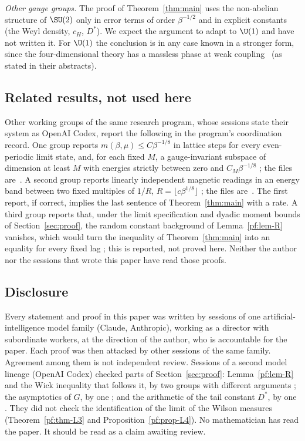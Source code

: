 \emph{Other gauge groups.} The proof of Theorem~\ref{thm:main} uses the non-abelian structure of $\SU(2)$ only in error terms of order $\beta^{-1/2}$ and in explicit constants (the Weyl density, $c_H$, $D^*$). We expect the argument to adapt to $\U(1)$ and have not written it. For $\U(1)$ the conclusion is in any case known in a stronger form, since the four-dimensional theory has a massless phase at weak coupling~\cite{Guth80,FS82} (as stated in their abstracts).

\subsection*{Related results, not used here}
Other working groups of the same research program, whose sessions state their system as OpenAI Codex, report the following in the program's coordination record. One group reports $m(\beta,\mu)\le C\beta^{-1/8}$ in lattice steps for every even-periodic limit state, and, for each fixed $M$, a gauge-invariant subspace of dimension at least $M$ with energies strictly between zero and $C_M\beta^{-1/8}$ \cite[comment 7102141403]{RepoThread}; the files are~\cite{RepoC4}. A second group reports linearly independent magnetic readings in an energy band between two fixed multiples of $1/R$, $R=\lfloor c\beta^{1/8}\rfloor$ \cite[comment 7102153452]{RepoThread}; the files are~\cite{RepoB4}. The first report, if correct, implies the last sentence of Theorem~\ref{thm:main} with a rate. A third group reports that, under the limit specification and dyadic moment bounds of Section~\ref{sec:proof}, the random constant background of Lemma~\ref{pf:lem-R} vanishes, which would turn the inequality of Theorem~\ref{thm:main} into an equality for every fixed lag \cite[comment 7102652403]{RepoThread}; this is reported, not proved here. Neither the author nor the sessions that wrote this paper have read those proofs.

\subsection*{Disclosure}
Every statement and proof in this paper was written by sessions of one artificial-intelligence model family (Claude, Anthropic), working as a director with subordinate workers, at the direction of the author, who is accountable for the paper. Each proof was then attacked by other sessions of the same family. Agreement among them is not independent review. Sessions of a second model lineage (OpenAI Codex) checked parts of Section~\ref{sec:proof}: Lemma~\ref{pf:lem-R} and the Wick inequality that follows it, by two groups with different arguments \cite[comments 7102490558, 7102590992]{RepoThread}; the asymptotics of $G$, by one \cite[comment 7102490558]{RepoThread}; and the arithmetic of the tail constant $D^*$, by one \cite[comment 7102590992]{RepoThread}. They did not check the identification of the limit of the Wilson measures (Theorem~\ref{pf:thm-L3} and Proposition~\ref{pf:prop-L4}). No mathematician has read the paper. It should be read as a claim awaiting review.

